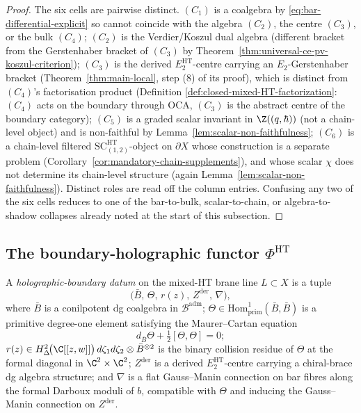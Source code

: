\begin{proof}
The six cells are pairwise distinct.  \((C_1)\) is a coalgebra by
\eqref{eq:bar-differential-explicit} so cannot coincide with the
algebra \((C_2)\), the centre \((C_3)\), or the bulk \((C_4)\);
\((C_2)\) is the Verdier/Koszul dual algebra (different bracket from
the Gerstenhaber bracket of \((C_3)\) by
Theorem~\ref{thm:universal-ce-pv-koszul-criterion});
\((C_3)\) is the derived \(E_2^{\mathrm{HT}}\)-centre carrying an
\(E_2\)-Gerstenhaber bracket
(Theorem~\ref{thm:main-local}, step (8) of its proof),
which is distinct from \((C_4)\)'s factorisation product (Definition
\ref{def:closed-mixed-HT-factorization}: \((C_4)\) acts on the
boundary through \(\mathrm{OCA}\), \((C_3)\) is the abstract centre
of the boundary category); \((C_5)\) is a graded scalar
invariant in \(\Z((q,\hbar))\) (not a chain-level object) and is
non-faithful by Lemma~\ref{lem:scalar-non-faithfulness}; \((C_6)\) is
a chain-level filtered \(\mathrm{SC}^{\mathrm{HT}}_{(1,2)}\)-object
on \(\partial X\) whose construction is a separate problem
(Corollary~\ref{cor:mandatory-chain-supplements}), and whose scalar
\(\chi\) does not determine its chain-level structure
(again Lemma~\ref{lem:scalar-non-faithfulness}).  Distinct roles are
read off the column entries.  Confusing any two of the six cells reduces to one of the
bar-to-bulk, scalar-to-chain, or algebra-to-shadow collapses
already noted at the start of this subsection.
\end{proof}

\subsection{The boundary-holographic functor
\texorpdfstring{$\Phi^{\mathrm{HT}}$}{Phi-HT}}
\label{ssec:phi-ht-functor}

\begin{defn}\label{defn:hol-bd-datum-HT}
A \emph{holographic-boundary datum} on the mixed-HT brane line
\(L\subset X\) is a tuple
\[
  \bigl(\bar B,\,\Theta,\,r(z),\,Z^{\mathrm{der}},\,\nabla\bigr),
\]
where \(\bar B\) is a conilpotent dg coalgebra in
\(\mathcal B^{\mathrm{adm}}\); \(\Theta\in
\mathrm{Hom}^1_{\mathrm{prim}}(\bar B,\bar B)\) is a primitive
degree-one element satisfying the Maurer--Cartan equation
\[
  d_{\bar B}\Theta+\tfrac12[\Theta,\Theta]=0;
\]
\(r(z)\in
H^2_{\Delta}\!\bigl(\C[[z,w]]\bigr)\,d\zeta_1d\zeta_2\otimes
\bar B^{\otimes 2}\) is the binary collision residue of \(\Theta\) at
the formal diagonal in \(\C^2\times\C^2\);
\(Z^{\mathrm{der}}\) is a derived \(E_2^{\mathrm{HT}}\)-centre carrying
a chiral-brace dg algebra structure; and \(\nabla\) is a flat
Gauss--Manin connection on bar fibres along the formal Darboux moduli
of \(b\), compatible with \(\Theta\) and inducing the Gauss--Manin
connection on \(Z^{\mathrm{der}}\).
\end{defn}

